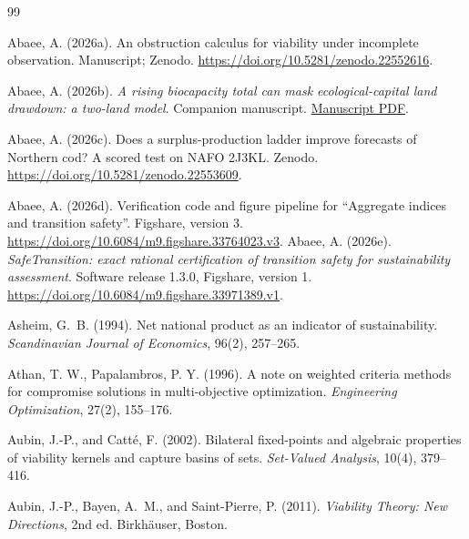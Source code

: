 \documentclass[preprint,11pt,authoryear]{elsarticle}
\theoremstyle{definition}
\theoremstyle{remark}
\begin{document}
\begin{thebibliography}{99}
\makeatletter\renewcommand{\@biblabel}[1]{}\makeatother

 Abaee, A. (2026a). An obstruction calculus for viability under incomplete observation. Manuscript; Zenodo. \url{https://doi.org/10.5281/zenodo.22552616}.

 Abaee, A. (2026b). \emph{A rising biocapacity total can mask ecological-capital land drawdown: a two-land model}. Companion manuscript. \href{https://github.com/MIKEAA2020/general-sustainability/blob/6f626ee48b2a3a59282b5df5adda76c8d5993fdc/agent%202%20productivity%20illusion/output_v45_ecomod_continued_10_gemini38_v4base_si_review_20261026/ecomod_continued_10.pdf}{Manuscript PDF}.

 Abaee, A. (2026c). Does a surplus-production ladder improve forecasts of Northern cod? A scored test on NAFO 2J3KL. Zenodo. \url{https://doi.org/10.5281/zenodo.22553609}.

 Abaee, A. (2026d). Verification code and figure pipeline for ``Aggregate indices and transition safety''. Figshare, version 3. \url{https://doi.org/10.6084/m9.figshare.33764023.v3}.
 Abaee, A. (2026e). \emph{SafeTransition: exact rational certification of transition safety for sustainability assessment}. Software release 1.3.0, Figshare, version 1. \url{https://doi.org/10.6084/m9.figshare.33971389.v1}.

 Asheim, G.~B. (1994). Net national product as an indicator of sustainability. \emph{Scandinavian Journal of Economics}, 96(2), 257--265.

 Athan, T. W., Papalambros, P. Y. (1996). A note on weighted criteria methods for compromise solutions in multi-objective optimization. \emph{Engineering Optimization}, 27(2), 155--176.

 Aubin, J.-P., and Catt\'e, F. (2002). Bilateral fixed-points and algebraic properties of viability kernels and capture basins of sets. \emph{Set-Valued Analysis}, 10(4), 379--416.

 Aubin, J.-P., Bayen, A.~M., and Saint-Pierre, P. (2011). \emph{Viability Theory: New Directions}, 2nd ed. Birkh\"auser, Boston.


\end{thebibliography}
\end{document}
